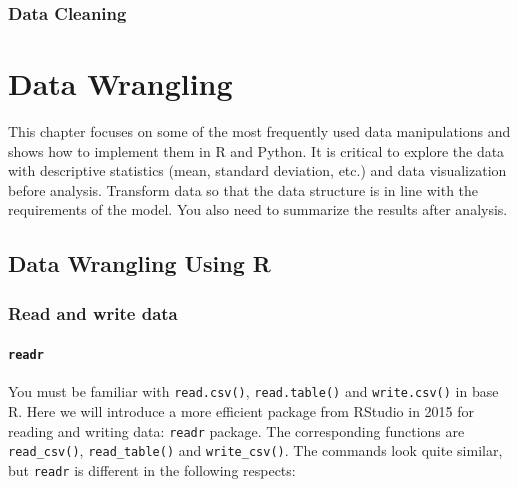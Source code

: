 \documentclass[12pt,]{krantz}
\theoremstyle{definition}
\theoremstyle{definition}
\theoremstyle{definition}
\theoremstyle{remark}
\begin{document}
\subsection{Data Cleaning}\label{data-cleaning-1}

\chapter{Data Wrangling}\label{data-wrangling}

This chapter focuses on some of the most frequently used data
manipulations and shows how to implement them in R and Python. It is
critical to explore the data with descriptive statistics (mean, standard
deviation, etc.) and data visualization before analysis. Transform data
so that the data structure is in line with the requirements of the
model. You also need to summarize the results after analysis.

\section{Data Wrangling Using R}\label{data-wrangling-using-r}

\subsection{Read and write data}\label{read-and-write-data}

\subsubsection{\texorpdfstring{\texttt{readr}}{readr}}\label{readr}

You must be familiar with \texttt{read.csv()}, \texttt{read.table()} and
\texttt{write.csv()} in base R. Here we will introduce a more efficient
package from RStudio in 2015 for reading and writing data:
\texttt{readr} package. The corresponding functions are
\texttt{read\_csv()}, \texttt{read\_table()} and \texttt{write\_csv()}.
The commands look quite similar, but \texttt{readr} is different in the
following respects:
\end{document}
